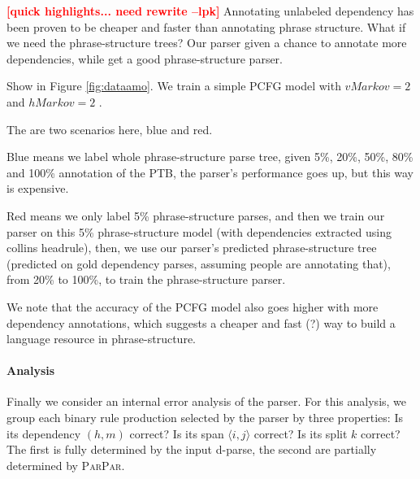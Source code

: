 \documentclass[11pt,letterpaper]{article}
\newcommand{\Span}[1]{\langle #1 \rangle}
\newcommand{\ParseName}{\textsc{ParPar}\xspace}
\newcommand{\lpkcomment}[1]{\textcolor{red}{\bf \small [#1 --lpk]}}
\begin{document}
\lpkcomment{quick highlights... need rewrite}
Annotating unlabeled dependency has been proven to be cheaper and faster than annotating phrase structure. \cite{nathanandhisfriends}
What if we need the phrase-structure trees? Our parser given a chance to annotate more dependencies, while get a good phrase-structure parser.

Show in Figure \ref{fig:dataamo}. We train a simple PCFG model with $vMarkov =2$ and $hMarkov = 2$ \cite{parentannotate}.

The are two scenarios here, blue and red.

Blue means we label whole phrase-structure parse tree, given 5\%, 20\%, 50\%, 80\% and 100\% annotation of the PTB, the parser's performance goes up, but this way is expensive.

Red means we only label 5\% phrase-structure parses, and then we train our parser on this 5\% phrase-structure model (with dependencies extracted using collins headrule), then, we use our parser's predicted phrase-structure tree (predicted on gold dependency parses, assuming people are annotating that), from 20\% to 100\%, to train the phrase-structure parser.

We note that the accuracy of the PCFG model also goes higher with more dependency annotations, which suggests a cheaper and fast (?) way to build a language resource in phrase-structure.




\paragraph{Analysis}
\label{sec:analysis}
Finally we consider an internal error analysis of
the parser. For this analysis, we group each binary rule production
selected by the parser by three properties:
Is its dependency $(h, m)$ correct? Is its span $\Span{i,j}$ correct? 
Is its split $k$ correct? The first is fully determined by the 
input d-parse, the second are partially determined by \ParseName.
\end{document}
